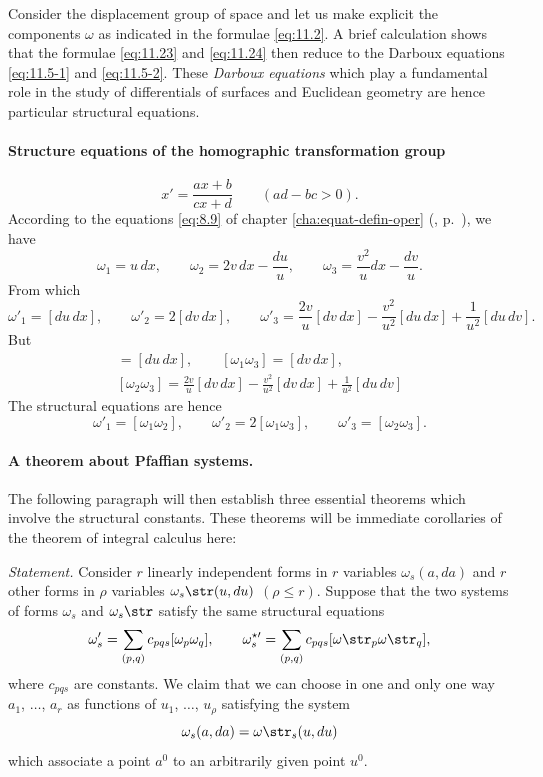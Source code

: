 Consider the displacement group of space and let us make explicit the components $\omega$ as indicated in the formulae \eqref{eq:11.2}. A brief calculation shows that the formulae \eqref{eq:11.23} and \eqref{eq:11.24} then reduce to the Darboux equations \eqref{eq:11.5-1} and \eqref{eq:11.5-2}. These \emph{Darboux equations} which play a fundamental role in the study of differentials of surfaces and Euclidean geometry are hence particular structural equations.

\paragraph{Structure equations of the homographic transformation group}
\label{sec:161}
\[
x'=\frac{ax+b}{cx+d}\qquad(ad-bc>0).
\]
According to the equations \eqref{eq:8.9} of chapter \ref{cha:equat-defin-oper} (, p.~\pageref{sec:108}), we have
\[
\omega_{1}=u\,dx,\qquad\omega_{2}=2v\,dx-\frac{du}{u},\qquad\omega_{3}=\frac{v^{2}}{u}dx-\frac{dv}{u}.
\]
From which
\[
\omega'_{1}=[du\,dx],\qquad\omega'_{2}=2[dv\,dx],\qquad\omega'_{3}=\frac{2v}{u}[dv\,dx]-\frac{v^{2}}{u^{2}}[du\,dx]+\frac{1}{u^{2}}[du\,dv].
\]
But
\begin{gather*}
  [\omega_{1}\omega_{2}]=[du\,dx],\qquad[\omega_{1}\omega_{3}]=[dv\,dx],\\
  [\omega_{2}\omega_{3}]=\frac{2v}{u}[dv\,dx]-\frac{v^{2}}{u^{2}}[dv\,dx]+\frac{1}{u^{2}}[du\,dv]
\end{gather*}
The structural equations are hence
\begin{equation}
  \label{eq:11.28}
  \omega'_{1}=[\omega_{1}\omega_{2}],\qquad\omega'_{2}=2[\omega_{1}\omega_{3}],\qquad\omega'_{3}=[\omega_{2}\omega_{3}].
\end{equation}

\paragraph{A theorem about Pfaffian systems.}
\label{sec:162}
The following paragraph will then establish three essential theorems which involve the structural constants. These theorems will be immediate corollaries of the theorem of integral calculus here:

\somespace

\emph{Statement.} Consider $r$ linearly independent forms in $r$ variables $\omega_{s}(a,da)$ and $r$ other forms in $\rho$ variables $\omega_{s}\str(u,du)$ $(\rho\le r)$. Suppose that the two systems of forms $\omega_{s}$ and $\omega_{s}\str$ satisfy the same structural equations
\[
\omega'_{s}=\sum_{(p,q)}c_{pqs}[\omega_{p}\omega_{q}],\qquad
\omega^{\star\prime}_{s}=\sum_{(p,q)}c_{pqs}[\omega\str_{p}\omega\str_{q}],
\]
where $c_{pqs}$ are constants. We claim that we can choose in one and only one way $a_{1}$, $\dots$, $a_{r}$ as functions of $u_{1}$, $\dots$, $u_{\rho}$ satisfying the system
\begin{equation}
  \label{eq:11.29}
  \omega_{s}(a,da)=\omega\str_{s}(u,du)
\end{equation}
which associate a point $a^{0}$ to an arbitrarily given point $u^{0}$.

